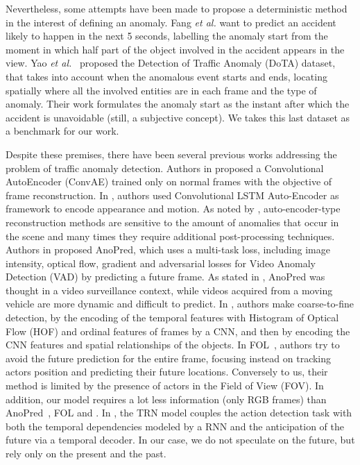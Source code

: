 Nevertheless, some attempts have been made to propose a deterministic method in the interest of defining an anomaly.
Fang \emph{et al.} \cite{fang2019dada} want to predict an accident likely to happen in the next 5 seconds, labelling the anomaly start from the moment in which half part of the object involved in the accident appears in the view.
Yao \emph{et al.}~\cite{9712446} proposed the Detection of Traffic Anomaly (DoTA) dataset, that takes into account when the anomalous event starts and ends, locating spatially where all the involved entities are in each frame and the type of anomaly.
Their work formulates the anomaly start as the instant after which the accident is unavoidable (still, a subjective concept).
We takes this last dataset as a benchmark for our work.

Despite these premises, there have been several previous works addressing the problem of traffic anomaly detection.
Authors in \cite{hasan2016learning} proposed a Convolutional AutoEncoder (ConvAE) trained only on normal frames with the objective of frame reconstruction.
In \cite{luo2017remembering, wang2018abnormal}, authors used Convolutional LSTM Auto-Encoder as framework to encode appearance and motion.
As noted by \cite{ramachandra2020survey}, auto-encoder-type reconstruction methods are sensitive to the amount of anomalies that occur in the scene and many times they require additional post-processing techniques.
Authors in \cite{liu2018future} proposed AnoPred, which uses a multi-task loss, including image intensity, optical flow, gradient and adversarial losses for Video Anomaly Detection (VAD) by predicting a future frame.
As stated in \cite{9712446}, AnoPred was thought in a video surveillance context, while videos acquired from a moving vehicle are more dynamic and difficult to predict.
In \cite{zhou_spatio-temporal_2022}, authors make coarse-to-fine detection, by the encoding of the temporal features with Histogram of Optical Flow (HOF) \cite{wang2013action} and ordinal features of frames by a CNN, and then by encoding the CNN features and spatial relationships of the objects.
In FOL~\cite{9712446}, authors try to avoid the future prediction for the entire frame, focusing instead on tracking actors position and predicting their future locations.
Conversely to us, their method is limited by the presence of actors in the Field of View (FOV).
In addition, our model requires a lot less information (only RGB frames) than AnoPred~\cite{liu2018future}, FOL \cite{9712446} and \cite{zhou_spatio-temporal_2022}.
In \cite{xu2019temporal}, the TRN model couples the action detection task with both the temporal dependencies modeled by a RNN and the anticipation of the future via a temporal decoder.
In our case, we do not speculate on the future, but rely only on the present and the past.

